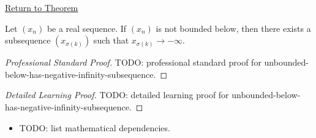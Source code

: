 \newpage
{}
\label{prf:unbounded-below-has-negative-infinity-subsequence}

\begin{remark*}[Return]
\hyperref[thm:unbounded-below-has-negative-infinity-subsequence]{Return to Theorem}
\end{remark*}

\begin{theorem*}
Let $(x_n)$ be a real sequence. If $(x_n)$ is not bounded below, then
there exists a subsequence $(x_{\sigma(k)})$ such that
$x_{\sigma(k)}\to-\infty$.

\smallskip
\noindent
\end{theorem*}

\begin{proof}[Professional Standard Proof]
\LRAProofBodyStart
TODO: professional standard proof for unbounded-below-has-negative-infinity-subsequence.
\end{proof}

\begin{proof}[Detailed Learning Proof]
\LRAProofBodyStart
TODO: detailed learning proof for unbounded-below-has-negative-infinity-subsequence.
\end{proof}

\begin{remark*}
\end{remark*}

\begin{dependencies}
\begin{itemize}
  \item TODO: list mathematical dependencies.
\end{itemize}
\end{dependencies}

\clearpage
